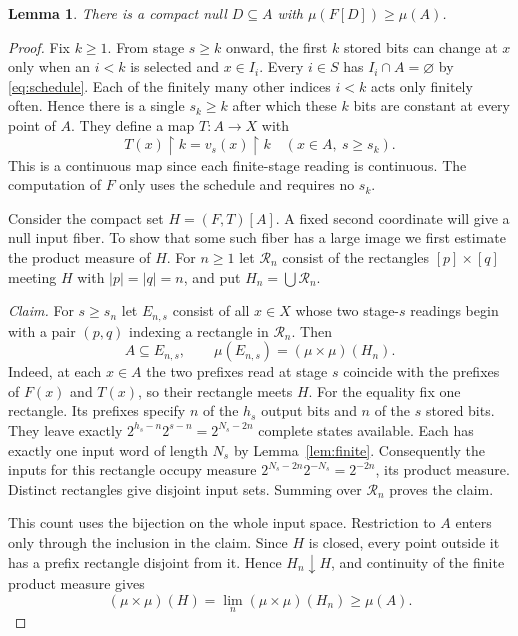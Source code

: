 \documentclass[12pt,reqno]{amsart}
\newtheorem{lemma}[theorem]{Lemma}
\newcommand{\pre}{\mathbin{\upharpoonright}}
\newcommand{\mass}{\mu}
\begin{document}
\begin{lemma}\label{lem:witness}
There is a compact null $D\subseteq A$ with $\mass(F[D])\ge\mass(A)$.
\end{lemma}
\begin{proof}
Fix $k\ge1$. From stage $s\ge k$ onward, the first $k$ stored bits can
change at $x$ only when an $i<k$ is selected and $x\in I_i$. Every
$i\in S$ has $I_i\cap A=\varnothing$ by \eqref{eq:schedule}. Each of
the finitely many other indices $i<k$ acts only finitely often. Hence
there is a single $s_k\ge k$ after which these $k$ bits are constant at
every point of $A$. They define a map $T:A\to X$ with
\[
       T(x)\pre k = v_s(x)\pre k \quad(x\in A,\ s\ge s_k).
\]
This is a continuous map since each finite-stage reading is continuous.
The computation of $F$ only uses the schedule and requires no $s_k$.

Consider the compact set $H=(F,T)[A]$. A fixed second coordinate
will give a null input fiber. To show that some such fiber has a large
image we first estimate the product measure of $H$. For $n\ge1$ let
$\mathcal R_n$ consist of the rectangles $[p]\times[q]$ meeting $H$
with $|p|=|q|=n$, and put $H_n=\bigcup\mathcal R_n$.

\smallskip
\noindent\textit{Claim.} For $s\ge s_n$ let $E_{n,s}$ consist of all
$x\in X$ whose two stage-$s$ readings begin with a pair $(p,q)$
indexing a rectangle in $\mathcal R_n$. Then
\[
 A\subseteq E_{n,s},\qquad
 \mass(E_{n,s})=(\mass\times\mass)(H_n).
\]
Indeed, at each $x\in A$ the two prefixes read at stage $s$ coincide
with the prefixes of $F(x)$ and $T(x)$, so their rectangle meets $H$.
For the equality fix one rectangle. Its prefixes specify $n$ of the
$h_s$ output bits and $n$ of the $s$ stored bits. They leave exactly
$2^{h_s-n}2^{s-n}=2^{N_s-2n}$ complete states available. Each has
exactly one input word of length $N_s$ by Lemma~\ref{lem:finite}.
Consequently the inputs for this rectangle occupy measure
$2^{N_s-2n}2^{-N_s}=2^{-2n}$, its product measure. Distinct rectangles
give disjoint input sets. Summing over $\mathcal R_n$ proves the claim.

This count uses the bijection on the whole input space. Restriction to
$A$ enters only through the inclusion in the claim. Since $H$ is closed,
every point outside it has a prefix rectangle disjoint from it. Hence
$H_n\downarrow H$, and continuity of the finite product measure gives
\begin{equation}\label{eq:mass}
 (\mass\times\mass)(H)=\lim_n(\mass\times\mass)(H_n)\ge\mass(A).
\end{equation}


\end{proof}
\end{document}
